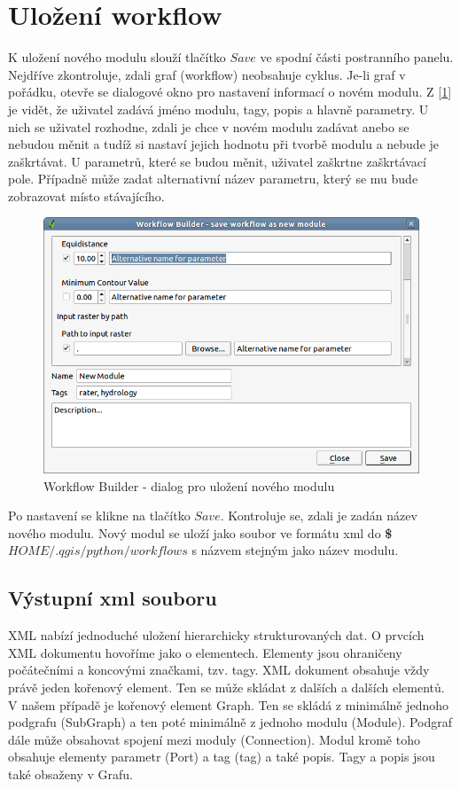 \newpage
\section{Uložení workflow}
\nocite{demel:book}

K uložení nového modulu slouží tlačítko $Save$ ve spodní části postranního panelu. Nejdříve  zkontroluje, zdali graf (workflow) neobsahuje cyklus. Je-li graf v pořádku, otevře se dialogové okno pro nastavení informací o novém modulu. Z [\figurename \ref{wf:saveDialog}] je vidět, že uživatel zadává jméno modulu, tagy, popis a hlavně parametry. U nich se uživatel rozhodne, zdali je chce v novém modulu zadávat anebo se nebudou měnit a tudíž si nastaví jejich hodnotu při tvorbě modulu a nebude je zaškrtávat. U parametrů, které se budou měnit, uživatel zaškrtne zaškrtávací pole. Případně může zadat alternativní název parametru, který se mu bude zobrazovat místo stávajícího.

\begin{figure}[h]
	\centering
	\includegraphics[scale=0.6]{pictures/wf/wf_saveDialog}
	\caption{Workflow Builder - dialog pro uložení nového modulu}
  	\label{wf:saveDialog}
\end{figure}

Po nastavení se klikne na tlačítko $Save$. Kontroluje se, zdali je zadán název nového modulu. Nový modul se uloží jako soubor ve formátu xml do \textbf{\$$HOME/.qgis/python/workflows$} s názvem stejným jako název modulu.  

\subsection{Výstupní xml souboru}
XML nabízí jednoduché uložení hierarchicky strukturovaných dat. O prvcích XML dokumentu hovoříme jako o elementech. Elementy jsou ohraničeny počátečními a koncovými značkami, tzv. tagy. XML dokument obsahuje vždy právě jeden kořenový element. Ten se může skládat z dalších a dalších elementů. V našem případě je kořenový element Graph. Ten se skládá z minimálně jednoho podgrafu (SubGraph) a ten poté minimálně z jednoho modulu (Module). Podgraf dále může obsahovat spojení mezi moduly (Connection). Modul kromě toho obsahuje elementy parametr (Port) a tag (tag) a také popis.  Tagy a popis jsou také obsaženy v Grafu. \\

